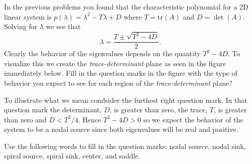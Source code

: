 \begin{problem}
    In the previous problems you found that the characteristic polynomial for a 2D linear
    system is $p(\lambda) = \lambda^2 - T \lambda + D$ where $T = \text{tr}(A)$ and $D=
    \det(A)$.  Solving for $\lambda$ we see that
    \[ \lambda = \frac{T \pm \sqrt{T^2 - 4 D}}{2}. \]
    Clearly the behavior of the eigenvalues depends on the quantity $T^2 - 4D$.  To
    visualize this we create the {\it trace-determinant} plane as seen in the figure
    immediately below.  Fill in the question marks in the figure with the type of behavior
    you expect to see for each region of the {\it trace-determinant} plane?

    To illustrate what we mean condsider the furthest right question mark.  In that
    question mark the determinant, $D$, is greater than zero, the trace, $T$, is greater
    than zero and $D < T^2 / 4$.  Hence $T^2 - 4D>0$ so we expect the behavior of the
    system to be a nodal source since both eigenvalues will be real and positive.

    Use the following words to fill in the question marks: nodal source, nodal sink,
    spiral source, spiral sink, center, and saddle.
\end{problem}
    \vspace{-0.1in}
        \begin{center}
        \end{center}

